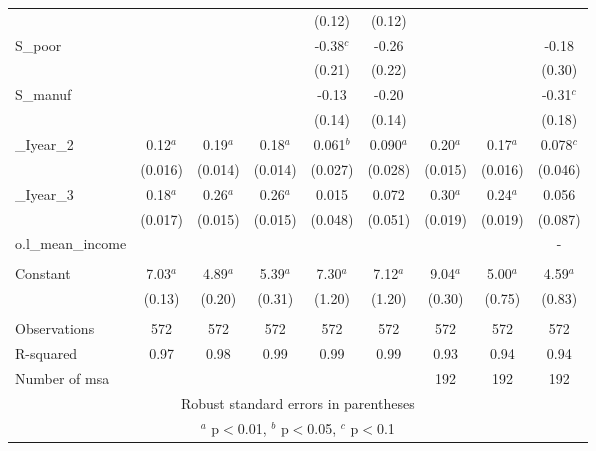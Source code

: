 \documentclass[]{article}
\begin{document}
\begin{tabular}{lcccccccc}
 &  &  &  & (0.12) & (0.12) &  &  &  \\
S\_poor &  &  &  & -0.38$^c$ & -0.26 &  &  & -0.18 \\
 &  &  &  & (0.21) & (0.22) &  &  & (0.30) \\
S\_manuf &  &  &  & -0.13 & -0.20 &  &  & -0.31$^c$ \\
 &  &  &  & (0.14) & (0.14) &  &  & (0.18) \\
\_Iyear\_2 & 0.12$^a$ & 0.19$^a$ & 0.18$^a$ & 0.061$^b$ & 0.090$^a$ & 0.20$^a$ & 0.17$^a$ & 0.078$^c$ \\
 & (0.016) & (0.014) & (0.014) & (0.027) & (0.028) & (0.015) & (0.016) & (0.046) \\
\_Iyear\_3 & 0.18$^a$ & 0.26$^a$ & 0.26$^a$ & 0.015 & 0.072 & 0.30$^a$ & 0.24$^a$ & 0.056 \\
 & (0.017) & (0.015) & (0.015) & (0.048) & (0.051) & (0.019) & (0.019) & (0.087) \\
o.l\_mean\_income &  &  &  &  &  &  &  & - \\
 &  &  &  &  &  &  &  &  \\
Constant & 7.03$^a$ & 4.89$^a$ & 5.39$^a$ & 7.30$^a$ & 7.12$^a$ & 9.04$^a$ & 5.00$^a$ & 4.59$^a$ \\
 & (0.13) & (0.20) & (0.31) & (1.20) & (1.20) & (0.30) & (0.75) & (0.83) \\
 &  &  &  &  &  &  &  &  \\
Observations & 572 & 572 & 572 & 572 & 572 & 572 & 572 & 572 \\
R-squared & 0.97 & 0.98 & 0.99 & 0.99 & 0.99 & 0.93 & 0.94 & 0.94 \\
 Number of msa &  &  &  &  &  & 192 & 192 & 192 \\ \hline
\multicolumn{9}{c}{ Robust standard errors in parentheses} \\
\multicolumn{9}{c}{ $^a$ p$<$0.01, $^b$ p$<$0.05, $^c$ p$<$0.1} \\
\end{tabular}
\end{document}
